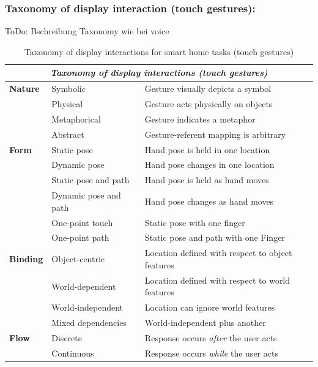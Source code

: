 \documentclass[sigchi]{acmart}
\begin{document}
	\subsubsection{Taxonomy of display interaction (touch gestures):}	
	ToDo: Bschreibung Taxonomy wie bei voice
	\begin{table}[t]
		\begin{center}
			\caption{Taxonomy of display interactions for smart home tasks (touch gestures)}
			\label{tab:taxDisplayTG}
			\begin{footnotesize}
				\begin{tabular}{p{} p{} p{}} \toprule
					\multicolumn{3}{c}{\textit{Taxonomy of display interactions (touch gestures)}} \\ \midrule
					\textbf{Nature}		& Symbolic		& Gesture visually depicts a symbol \\
										& Physical		& Gesture acts physically on objects \\ 
										& Metaphorical 	& Gesture indicates a metaphor \\ 
										& Abstract		& Gesture-referent mapping is arbitrary \\ \midrule
					\textbf{Form} 		& Static pose	& Hand pose is held in one location \\
										& Dynamic pose	& Hand pose changes in one location \\
										& Static pose and path 	& Hand pose is held as hand moves \\
										& Dynamic pose and path	& Hand pose changes as hand moves \\
										& One-point touch	& Static pose with one finger \\ 
										& One-point path	& Static pose and path with one Finger \\ \midrule
					\textbf{Binding}	& Object-centric 	& Location defined with respect to object features \\
										& World-dependent 	& Location defined with respect to world features \\
										& World-independent & Location can ignore world features \\
										& Mixed dependencies	& World-independent plus another \\ \midrule
					\textbf{Flow}		& Discrete		& Response occurs \textit{after} the user acts \\ 
										& Continuous 	& Response occurs \textit{while} the user acts  \\ \bottomrule
				\end{tabular}
			\end{footnotesize}
		\end{center}
	\end{table}
\end{document}
